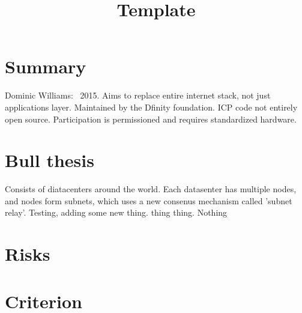 \documentclass{../notes}
\title{Template}
\begin{document}
\maketitle

\section{Summary}
Dominic Williams: ~2015. 
Aims to replace entire internet stack, not just applications layer. Maintained by the Dfinity foundation. ICP code not entirely open source. Participation is permissioned and requires standardized hardware. 


\section{Bull thesis}
Consists of diatacenters around the world. Each datasenter has multiple nodes, and nodes form subnets, which uses a new consenus mechanism called 'subnet relay'. 
Testing, adding some new thing. thing thing. Nothing

\section{Risks}

\section{Criterion}
\end{document}
